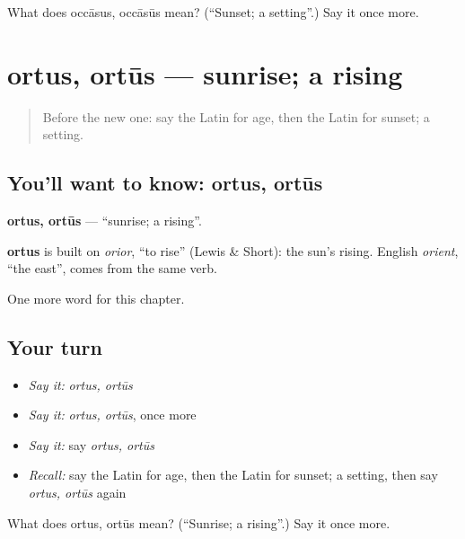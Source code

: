 \begin{tcolorbox}[breakable,colback=teal!4,colframe=teal!35!black,title={Before you move on}]
What does occāsus, occāsūs mean? (\textquotedblleft{}Sunset; a setting\textquotedblright{}.) Say it once more.
\end{tcolorbox}
\section[ortus, ortūs]{ortus, ortūs — sunrise; a rising}

\label{lesson:LA-C207-ortus}



\begin{quote}
Before the new one: say the Latin for age, then the Latin for sunset; a setting.
\end{quote}

\subsection*{You'll want to know: ortus, ortūs}
\textbf{ortus, ortūs} — \textquotedblleft{}sunrise; a rising\textquotedblright{}.

\begin{cousinweb}
\textbf{ortus} is built on \emph{orior}, \textquotedblleft{}to rise\textquotedblright{} (Lewis \& Short): the sun's rising. English \emph{orient}, \textquotedblleft{}the east\textquotedblright{}, comes from the same verb.
\end{cousinweb}

\begin{grammarlens}[title={What you've built}]
One more word for this chapter.
\end{grammarlens}

\subsection*{Your turn}
\begin{itemize}
\raggedright
  \item \emph{Say it:} \emph{ortus, ortūs}
  \item \emph{Say it:} \emph{ortus, ortūs}, once more
  \item \emph{Say it:} say \emph{ortus, ortūs}
  \item \emph{Recall:} say the Latin for age, then the Latin for sunset; a setting, then say \emph{ortus, ortūs} again
\end{itemize}

\begin{tcolorbox}[breakable,colback=teal!4,colframe=teal!35!black,title={Before you move on}]
What does ortus, ortūs mean? (\textquotedblleft{}Sunrise; a rising\textquotedblright{}.) Say it once more.
\end{tcolorbox}
